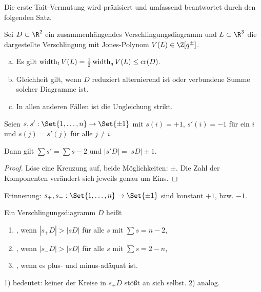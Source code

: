 Die erste Tait-Vermutung wird präzisiert und umfassend beantwortet durch den folgenden Satz.

\begin{st}
    Sei $D \subset \R^2$ ein zusammenhängendes Verschlingungsdiagramm und $L \subset \R^3$ die dargestellte Verschlingung mit Jones-Polynom $V(L) \in \Z[q^\pm]$.
    \begin{enumerate}[a)]
        \item
            Es gilt
            \begin{math}
                \operatorname{width}_t V(L) = \frac{1}{2} \operatorname{width}_q V(L) \le \operatorname{cr}(D).
            \end{math}
        \item
            Gleichheit gilt, wenn $D$ reduziert alternierend ist oder verbundene Summe solcher Diagramme ist.
        \item
            In allen anderen Fällen ist die Ungleichung strikt.
    \end{enumerate}
\end{st}



\begin{lem}
    Seien $s, s': \Set{1, \dotsc, n} \to \Set{\pm 1}$ mit $s(i) = +1$, $s'(i) = - 1$ für ein $i$ und $s(j) = s'(j)$ für alle $j \neq i$.

    Dann gilt $\sum s' = \sum s - 2$ und $|s'D| = |sD| \pm 1$.
    \begin{proof}
        Löse eine Kreuzung auf, beide Möglichkeiten: $\pm$.
        Die Zahl der Komponenten verändert sich jeweils genau um Eins.
    \end{proof}
\end{lem}

Erinnerung: $s_+, s_-: \Set{1, \dotsc, n} \to \Set{\pm 1}$ sind konstant $+1$, bzw. $-1$.

\begin{df}
    Ein Verschlingungsdiagramm $D$ heißt
    \begin{enumerate}[1)]
        \item
            , wenn $|s_+ D| > |sD|$ für alle $s$ mit $\sum s = n - 2$,
        \item
            , wenn $|s_- D| > |sD|$ für alle $s$ mit $\sum s = 2 - n$,
        \item
            , wenn es plus- und minus-adäquat ist.
    \end{enumerate}
    \begin{nt}
        1) bedeutet: keiner der Kreise in $s_+ D$ stößt an sich selbst.
        2) analog.
    \end{nt}
\end{df}

